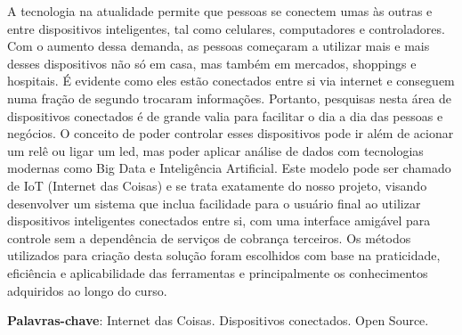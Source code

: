 \documentclass[../../layout.tex]{subfiles}
\begin{document}
\begin{resumo}
\hspace*{3em}
A tecnologia na atualidade permite que pessoas se conectem umas às outras e entre dispositivos inteligentes, tal como celulares, computadores e controladores. Com o aumento dessa demanda, as pessoas começaram a utilizar mais e mais desses dispositivos não só em casa, mas também em mercados, shoppings e hospitais. É evidente como eles estão conectados entre si via internet e conseguem numa fração de segundo trocaram informações. Portanto, pesquisas nesta área de dispositivos conectados é de grande valia para facilitar o dia a dia das pessoas e negócios. O conceito de poder controlar esses dispositivos pode ir além de acionar um relê ou ligar um led, mas poder aplicar análise de dados com tecnologias modernas como Big Data e Inteligência Artificial. Este modelo pode ser chamado de IoT (Internet das Coisas) e se trata exatamente do nosso projeto, visando desenvolver um sistema que inclua facilidade para o usuário final ao utilizar dispositivos inteligentes conectados entre si, com uma interface amigável para controle sem a dependência de serviços de cobrança terceiros. Os métodos utilizados para criação desta solução foram escolhidos com base na praticidade, eficiência e aplicabilidade das ferramentas e principalmente os conhecimentos adquiridos ao longo do curso.
\vspace{\onelineskip}

\noindent
\textbf{Palavras-chave}: Internet das Coisas. Dispositivos conectados. Open Source.
\end{resumo}
\end{document}
